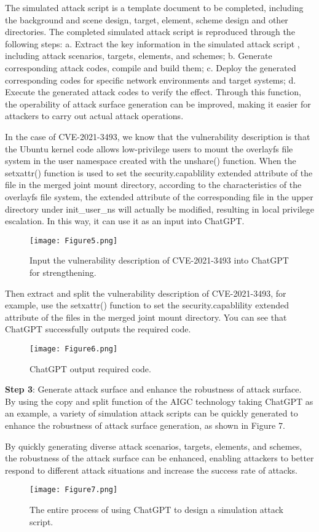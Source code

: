 \documentclass[runningheads]{llncs}
\begin{document}
%
The simulated attack script is a template document to be completed, including the background and scene design, target, element, scheme design and other directories. The completed simulated attack script is reproduced through the following steps: a. Extract the key information in the simulated attack script , including attack scenarios, targets, elements, and schemes; b. Generate corresponding attack codes, compile and build them; c. Deploy the generated corresponding codes for specific network environments and target systems; d. Execute the generated attack codes to verify the effect. Through this function, the operability of attack surface generation can be improved, making it easier for attackers to carry out actual attack operations.\par
%
In the case of CVE-2021-3493, we know that the vulnerability description is that the Ubuntu kernel code allows low-privilege users to mount the overlayfs file system in the user namespace created with the unshare() function. When the setxattr() function is used to set the security.capablility extended attribute of the file in the merged joint mount directory, according to the characteristics of the overlayfs file system, the extended attribute of the corresponding file in the upper directory under init\_user\_ns will actually be modified, resulting in local privilege escalation. In this way, it can use it as an input into ChatGPT.\par
%
\begin{figure}[H]
\centering
\texttt{[image: Figure5.png]}
\caption{Input the vulnerability description of CVE-2021-3493 into ChatGPT for strengthening.} \label{fig5}
\end{figure}
\vspace{-2em}
%
Then extract and split the vulnerability description of CVE-2021-3493, for example, use the setxattr() function to set the security.capablility extended attribute of the files in the merged joint mount directory. You can see that ChatGPT successfully outputs the required code.
%
\begin{figure}[H]
\centering
\texttt{[image: Figure6.png]}
\caption{ChatGPT output required code.} \label{fig6}
\end{figure}
\vspace{-2em}
%
\textbf{Step 3}: Generate attack surface and enhance the robustness of attack surface. By using the copy and split function of the AIGC technology taking ChatGPT as an example, a variety of simulation attack scripts can be quickly generated to enhance the robustness of attack surface generation, as shown in Figure 7.\par
%
By quickly generating diverse attack scenarios, targets, elements, and schemes, the robustness of the attack surface can be enhanced, enabling attackers to better respond to different attack situations and increase the success rate of attacks.
%
\begin{figure}[H]
\centering
\texttt{[image: Figure7.png]}
\caption{The entire process of using ChatGPT to design a simulation attack script.} \label{fig7}
\end{figure}
%
\end{document}
